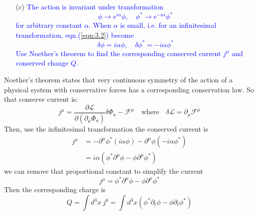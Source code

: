 \documentclass[11pt, a4paper]{article}
\begin{document}
\begin{enumerate}
    \item [(c)] \textcolor{blue}{
    The action is invariant under transformation
    \begin{equation}\label{eqn:3.2}
        \phi \to e^{i\alpha} \phi, \quad \phi^* \to e^{-i\alpha} \phi^*
    \end{equation}
    for arbitrary constant $\alpha$. When $\alpha$ is small, $\mbox{i.e.}$ for an infinitesimal transformation, eqn.(\ref{eqn:3.2}) become
    \begin{equation}\label{eqn:3.3}
        \delta\phi = i\alpha\phi, \quad \delta\phi^* = -i\alpha \phi^*
    \end{equation}
    Use Noether's theorem to find the corresponding conserved current $j^\mu$ and conserved change $Q$.
    }
\end{enumerate}
Noether's theorem states that very continuous symmetry of the action of a physical system with conservative forces has a corresponding conservation law.
So that conserve current is:
\begin{equation}
    j^\mu = \frac{\partial \mathcal{L}}{\partial (\partial_\mu \Phi_{a})}\delta\Phi_{a} - \mathcal{F}^\mu \quad \mbox{where} \quad \delta \mathcal{L} = \partial_\mu \mathcal{F}^\mu
\end{equation}
Then, use the infinitesimal transformation the conserved current is
\begin{align}
    j^\mu & = -\partial^\mu \phi^*(i\alpha\phi) - \partial^\mu \phi (-i\alpha\phi^*) \\
    & = i\alpha(\phi^* \partial^\mu \phi - \phi \partial^\mu \phi^*)
\end{align}
we can remove that proportional constant to simplify the current
\begin{equation}
    j^\mu = \phi^* \partial^\mu \phi - \phi \partial^\mu \phi^*
\end{equation}
Then the corresponding charge is
\begin{equation}
    Q = \int d^3x \ j^0 = \int d^3 x (\phi^* \partial_t \phi - \phi \partial_t \phi^*)
\end{equation}
\end{document}
